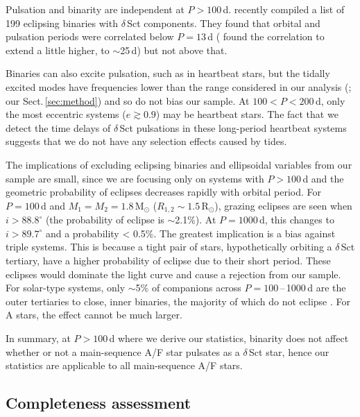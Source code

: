 \documentclass[a4paper,fleqn,usenatbib]{mnras}
\begin{document}
Pulsation and binarity are independent at $P>100$\,d. \citet{liakos&niarchos2017} recently compiled a list of 199 eclipsing binaries with $\delta$\,Sct components. They found that orbital and pulsation periods were correlated below $P=13$\,d (\citealt{kahramanetal2017} found the correlation to extend a little higher, to $\sim$25\,d) but not above that.

Binaries can also excite pulsation, such as in heartbeat stars, but the tidally excited modes have frequencies lower than the range considered in our analysis (\citealt{fuller2017}; our Sect.\,\ref{sec:method}) and so do not bias our sample. At $100<P<200$\,d, only the most eccentric systems ($e\gtrsim0.9$) may be heartbeat stars. The fact that we detect the time delays of $\delta$\,Sct pulsations in these long-period heartbeat systems suggests that we do not have any selection effects caused by tides.

The implications of excluding eclipsing binaries and ellipsoidal variables from our sample are small, since we are focusing only on systems with $P > 100$\,d and the geometric probability of eclipses decreases rapidly with orbital period. For $P = 100$\,d and $M_1 = M_2 = 1.8$\,M$_{\odot}$ ($R_{1,2}\sim1.5$\,R$_{\odot}$), grazing eclipses are seen when $i > 88.8^{\circ}$ (the probability of eclipse is $\sim$2.1\%). At $P = 1000$\,d, this changes to $i>89.7^{\circ}$ and a probability < 0.5\%. The greatest implication is a bias against triple systems. This is because a tight pair of stars, hypothetically orbiting a $\delta$\,Sct tertiary, have a higher probability of eclipse due to their short period. These eclipses would dominate the light curve and cause a rejection from our sample. For solar-type systems, only $\sim$5\% of companions across $P = 100$\,--\,1000\,d are the outer tertiaries to close, inner binaries, the majority of which do not eclipse \citep{tokovinin2008,moe&distefano2017}. For A stars, the effect cannot be much larger.

In summary, at $P>100$\,d where we derive our statistics, binarity does not affect whether or not a main-sequence A/F star pulsates as a $\delta$\,Sct star, hence our statistics are applicable to all main-sequence A/F stars.



\subsection{Completeness assessment}
\label{ssec:detection_efficiency}
\end{document}
